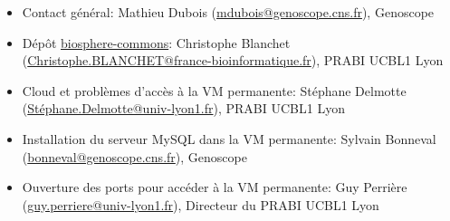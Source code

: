 \begin{itemize}
    \item Contact général: Mathieu Dubois (\href{mailto:mdubois@genoscope.cns.fr}{mdubois@genoscope.cns.fr}), Genoscope
    \item Dépôt \href{https://github.com/IFB-ElixirFr/biosphere-commons}{biosphere-commons}: Christophe Blanchet (\href{mailto:Christophe.BLANCHET@france-bioinformatique.fr}{Christophe.BLANCHET@france-bioinformatique.fr}), PRABI UCBL1 Lyon
    \item Cloud  et problèmes d'accès à la VM permanente: Stéphane Delmotte (\href{mailto:Stéphane.Delmotte@univ-lyon1.fr}{Stéphane.Delmotte@univ-lyon1.fr}), PRABI UCBL1 Lyon
    \item Installation du serveur MySQL dans la VM permanente: Sylvain Bonneval (\href{mailto:bonneval@genoscope.cns.fr}{bonneval@genoscope.cns.fr}), Genoscope
    \item Ouverture des ports pour accéder à la VM permanente: Guy Perrière (\href{mailto:guy.perriere@univ-lyon1.fr}{guy.perriere@univ-lyon1.fr}), Directeur du PRABI UCBL1 Lyon
\end{itemize}
